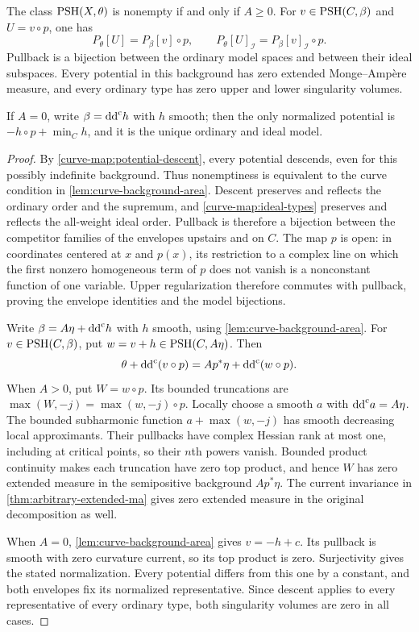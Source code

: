 \begin{lemma}\label{fibration:curve-envelope-pullback}
The class $\mathrm{PSH}(X,\theta)$ is nonempty if and only if $A\geq0$.
For $v\in\mathrm{PSH}(C,\beta)$ and $U=v\circ p$, one has
\[
 P_\theta[U]=P_\beta[v]\circ p,\qquad
 P_\theta[U]_{\mathcal I}=P_\beta[v]_{\mathcal I}\circ p.
\]
Pullback is a bijection between the ordinary model spaces and
between their ideal subspaces. Every potential in this background
has zero extended Monge--Amp\`ere measure, and every ordinary type
has zero upper and lower singularity volumes.

If $A=0$, write $\beta=\mathrm{dd}^{\mathrm{c}} h$ with $h$ smooth; then the only
normalized potential is $-h\circ p+\min_Ch$, and it is the unique
ordinary and ideal model.
\end{lemma}
\begin{proof}
By \cref{curve-map:potential-descent}, every potential descends,
even for this possibly indefinite background. Thus nonemptiness
is equivalent to the curve condition in
\cref{lem:curve-background-area}. Descent preserves and reflects
the ordinary order and the supremum, and \cref{curve-map:ideal-types}
preserves and reflects the all-weight ideal order. Pullback is
therefore a bijection between the competitor families of the
envelopes upstairs and on $C$. The map $p$ is open: in coordinates
centered at $x$ and $p(x)$, its restriction to a complex line on
which the first nonzero homogeneous term of $p$ does not vanish is
a nonconstant function of one variable. Upper regularization
therefore commutes with pullback, proving the envelope identities
and the model bijections.

Write $\beta=A\eta+\mathrm{dd}^{\mathrm{c}} h$ with $h$ smooth, using
\cref{lem:curve-background-area}. For $v\in\mathrm{PSH}(C,\beta)$, put
$w=v+h\in\mathrm{PSH}(C,A\eta)$. Then
\[
 \theta+\mathrm{dd}^{\mathrm{c}}(v\circ p)
   =A p^*\eta+\mathrm{dd}^{\mathrm{c}}(w\circ p).
\]
When $A>0$, put $W=w\circ p$. Its bounded truncations are
$\max(W,-j)=\max(w,-j)\circ p$. Locally choose a smooth $a$
with $\mathrm{dd}^{\mathrm{c}} a=A\eta$. The bounded subharmonic function
$a+\max(w,-j)$ has smooth decreasing local approximants. Their
pullbacks have complex Hessian rank at most one, including at
critical points, so their $n$th powers vanish. Bounded product
continuity makes each truncation have zero top product, and
hence $W$ has zero extended measure in the semipositive
background $Ap^*\eta$.
The current invariance in
\cref{thm:arbitrary-extended-ma} gives zero extended measure in
the original decomposition as well.

When $A=0$, \cref{lem:curve-background-area} gives $v=-h+c$. Its pullback is
smooth with zero curvature current, so its top product is zero.
Surjectivity gives the stated normalization. Every potential
differs from this one by a constant, and both envelopes fix its
normalized representative. Since descent applies to every
representative of every ordinary type, both singularity volumes
are zero in all cases.
\end{proof}

